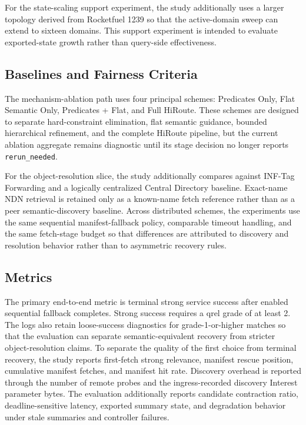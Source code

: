 \documentclass[journal]{IEEEtran}
\newcommand{\sysname}{HiRoute}
\begin{document}
For the state-scaling support experiment, the study additionally uses a larger topology derived from Rocketfuel 1239 so that the active-domain sweep can extend to sixteen domains. This support experiment is intended to evaluate exported-state growth rather than query-side effectiveness.

\subsection{Baselines and Fairness Criteria}

The mechanism-ablation path uses four principal schemes: Predicates Only, Flat Semantic Only, Predicates + Flat, and Full HiRoute. These schemes are designed to separate hard-constraint elimination, flat semantic guidance, bounded hierarchical refinement, and the complete \sysname{} pipeline, but the current ablation aggregate remains diagnostic until its stage decision no longer reports \texttt{rerun\_needed}.

For the object-resolution slice, the study additionally compares against INF-Tag Forwarding and a logically centralized Central Directory baseline. Exact-name NDN retrieval is retained only as a known-name fetch reference rather than as a peer semantic-discovery baseline. Across distributed schemes, the experiments use the same sequential manifest-fallback policy, comparable timeout handling, and the same fetch-stage budget so that differences are attributed to discovery and resolution behavior rather than to asymmetric recovery rules.

\subsection{Metrics}

The primary end-to-end metric is terminal strong service success after enabled sequential fallback completes. Strong success requires a qrel grade of at least 2. The logs also retain loose-success diagnostics for grade-1-or-higher matches so that the evaluation can separate semantic-equivalent recovery from stricter object-resolution claims. To separate the quality of the first choice from terminal recovery, the study reports first-fetch strong relevance, manifest rescue position, cumulative manifest fetches, and manifest hit rate. Discovery overhead is reported through the number of remote probes and the ingress-recorded discovery Interest parameter bytes. The evaluation additionally reports candidate contraction ratio, deadline-sensitive latency, exported summary state, and degradation behavior under stale summaries and controller failures.
\end{document}
